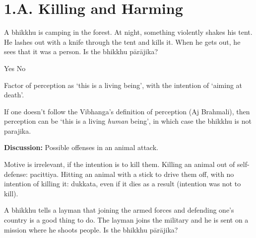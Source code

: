 \chapter{1.A. Killing and Harming}
\renewcommand*{\theChapterTitle}{1.A. Killing and Harming}

\begin{exam}{\autoExamName}

\begin{problem*}

  \begin{parts}

  \item A bhikkhu is camping in the forest. At night, something violently shakes
    his tent. He lashes out with a knife through the tent and kills it. When he
    gets out, he sees that it was a person. Is the bhikkhu pārājika?

    \bigskip

    \begin{answers}{2}
      \bChoices
       Yes\eAns
       No\eAns
      \eChoices
    \end{answers}

    \bigskip

    \begin{solution}
      Factor of perception as `this is a living being', with the intention of
      `aiming at death'.

      If one doesn't follow the Vibhanga's definition of perception (Aj
      Brahmali), then perception can be `this is a living \emph{human} being',
      in which case the bhikkhu is not parajika.
    \end{solution}

    \textbf{Discussion:} Possible offenses in an animal attack.

    \begin{solution}
      Motive is irrelevant, if the intention is to kill them. Killing an animal
      out of self-defense: pacittiya. Hitting an animal with a stick to drive
      them off, with no intention of killing it: dukkata, even if it dies as a
      result (intention was not to kill).
    \end{solution}

    \bigskip

  \item A bhikkhu tells a layman that joining the armed forces and defending
    one's country is a good thing to do. The layman joins the military and he is
    sent on a mission where he shoots people. Is the bhikkhu pārājika?


\end{parts}
\end{problem*}
\end{exam}

